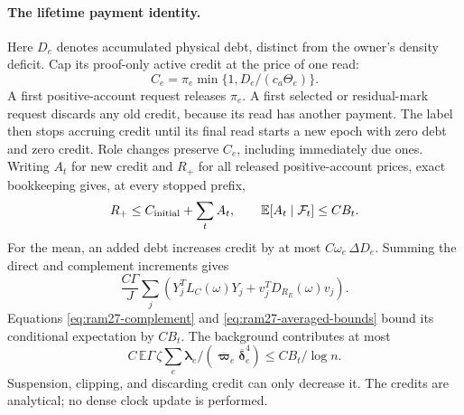 \documentclass[11pt]{article}
\theoremstyle{remark}
\newcommand{\llambda}{\boldsymbol{\lambda}}
\newcommand{\vvpbar}{\overline{\boldsymbol{\varpi}}}
\newcommand{\ddeltabar}{\overline{\boldsymbol{\delta}}}
\newcommand{\Ex}{\mathbb E}
\begin{document}
\paragraph{The lifetime payment identity.}
Here $D_e$ denotes accumulated physical debt, distinct from the owner's density
deficit.
Cap its proof-only active credit at the price of one read:
\[
 C_e=\pi_e\min\{1,D_e/(c_a\Theta_e)\}.
\]
A first positive-account request releases $\pi_e$.
A first selected or residual-mark request discards any old credit, because its
read has another payment.
The label then stops accruing credit until its final read starts a new epoch
with zero debt and zero credit.
Role changes preserve $C_e$, including immediately due ones.
Writing $A_t$ for new credit and $R_+$ for all released positive-account prices,
exact bookkeeping gives, at every stopped prefix,
\begin{equation}\label{eq:ram27-ledger}
 R_+\le C_{\rm initial}+\sum_t A_t,\qquad
 \Ex[A_t\mid\mathcal F_t]\le C B_t .
\end{equation}
For the mean, an added debt increases credit by at most $C\omega_e\,\Delta D_e$.
Summing the direct and complement increments gives
\[
 \frac{C\Gamma}{J}\sum_j
       \left(Y_j^TL_C(\omega)Y_j+
                         v_j^TD_{R_E}(\omega)v_j\right).
\]
Equations \eqref{eq:ram27-complement} and \eqref{eq:ram27-averaged-bounds} bound
its conditional expectation by $CB_t$.
The background contributes at most
\[
 C\,\Ex\Gamma\,\zeta
            \sum_e\llambda_e/(\vvpbar_e\ddeltabar_e^4)
                         \le CB_t/\log n .
\]
Suspension, clipping, and discarding credit can only decrease it.
The credits are analytical; no dense clock update is performed.
\end{document}
